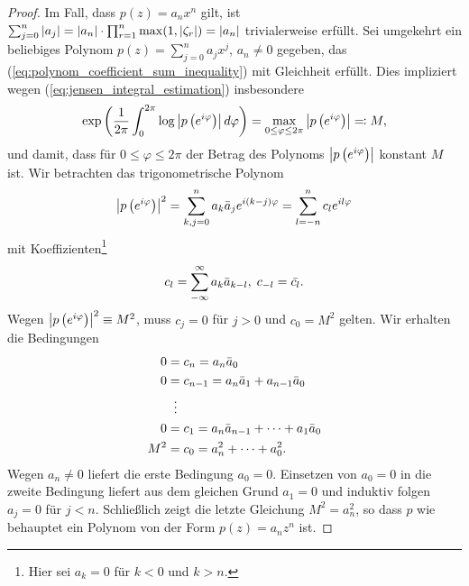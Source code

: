\begin{proof}
    \noindent Im Fall, dass $p(z) = a_n x^n$ gilt, ist
    $ \sum_{j=0}^{n} \left\lvert a_j \right\rvert
      = \left\lvert a_n \right\rvert \cdot \prod_{r=1}^n \max(1, \left\lvert \zeta_r \right\rvert)
      = \left\lvert a_n \right\rvert $
    trivialerweise erfüllt.
    Sei umgekehrt  ein beliebiges Polynom
    $p(z) = \sum_{j=0}^n a_j x^j$, $a_n \neq 0$ gegeben, das
    (\ref{eq:polynom_coefficient_sum_inequality}) mit
    Gleichheit erfüllt.
    Dies impliziert wegen (\ref{eq:jensen_integral_estimation}) insbesondere
    \[
        \exp\left( \frac{1}{2\pi} \int_{0}^{2\pi} \log \left\lvert p\left( e^{i\varphi} \right) \right\rvert d\varphi \right)
        = \max_{0 \leq \varphi \leq 2\pi} \left\lvert p\left( e^{i\varphi} \right)  \right\rvert
        \eqqcolon M,
    \]
    und damit, dass für $0 \leq \varphi \leq 2 \pi$ der Betrag des Polynoms
    $\left\lvert p\left( e^{i\varphi} \right) \right\rvert$ konstant $M$ ist.
    Wir betrachten das trigonometrische Polynom
    \[
        \left\lvert p\left( e^{i\varphi} \right) \right\rvert^2
        = \sum_{k,j=0}^n a_k \bar{a}_j e^{i(k-j)\varphi}
        = \sum_{l=-n}^n c_l e^{i l \varphi}
    \]
    mit Koeffizienten\footnote{Hier sei $a_k = 0$ für $k<0$ und $k > n$.}
    \[
        c_l = \sum_{-\infty}^\infty a_k \bar{a}_{k-l}, \; c_{-l} = \bar{c_l}.
    \]
    Wegen $\left\lvert p\left( e^{i\varphi} \right) \right\rvert^2 \equiv M^2$, muss $c_j = 0$ für
    $j > 0$ und $c_0 = M^2$ gelten.
    Wir erhalten die Bedingungen
    \begin{equation*}
        \begin{split}
            0 &= c_n = a_n \bar{a}_0\\
            0 &= c_{n-1} = a_n \bar{a}_1 + a_{n-1} \bar{a}_0\\
              &\;\;\vdots\\
            0 &= c_1 = a_n \bar{a}_{n-1} + \dots + a_{1} \bar{a}_0\\
            M^2 &= c_0 = a_n^2 + \dots + a_0^2.
        \end{split}
    \end{equation*}
    Wegen $a_n \neq 0$ liefert die erste Bedingung $a_0 = 0$.
    Einsetzen von $a_0 = 0$ in die zweite Bedingung liefert aus dem gleichen
    Grund $a_1 = 0$ und induktiv folgen $a_j = 0$ für $j < n$.
    Schließlich zeigt die letzte Gleichung $M^2 = a_n^2$, so dass $p$ wie
    behauptet ein Polynom von der Form $p(z) = a_n z^n$ ist.
\end{proof}

